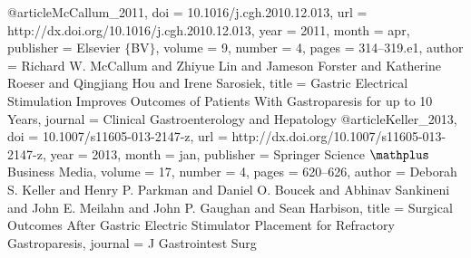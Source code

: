 @article{McCallum_2011,
	doi = {10.1016/j.cgh.2010.12.013},
	url = {http://dx.doi.org/10.1016/j.cgh.2010.12.013},
	year = 2011,
	month = {apr},
	publisher = {Elsevier $\lbrace$BV$\rbrace$},
	volume = {9},
	number = {4},
	pages = {314--319.e1},
	author = {Richard W. McCallum and Zhiyue Lin and Jameson Forster and Katherine Roeser and Qingjiang Hou and Irene Sarosiek},
	title = {Gastric Electrical Stimulation Improves Outcomes of Patients With Gastroparesis for up to 10 Years},
	journal = {Clinical Gastroenterology and Hepatology}
}
@article{Keller_2013,
	doi = {10.1007/s11605-013-2147-z},
	url = {http://dx.doi.org/10.1007/s11605-013-2147-z},
	year = 2013,
	month = {jan},
	publisher = {Springer Science $\mathplus$ Business Media},
	volume = {17},
	number = {4},
	pages = {620--626},
	author = {Deborah S. Keller and Henry P. Parkman and Daniel O. Boucek and Abhinav Sankineni and John E. Meilahn and John P. Gaughan and Sean Harbison},
	title = {Surgical Outcomes After Gastric Electric Stimulator Placement for Refractory Gastroparesis},
	journal = {J Gastrointest Surg}
}
